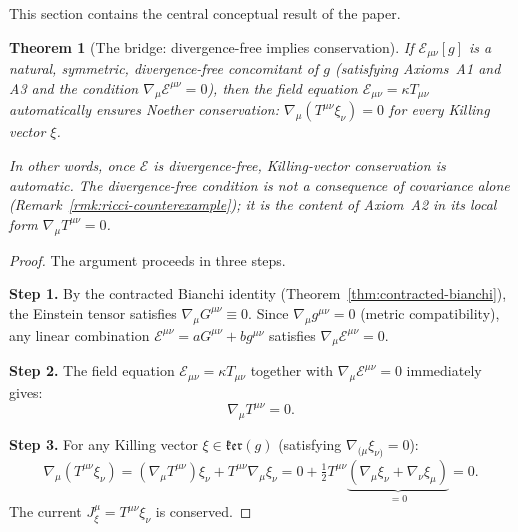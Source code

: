 \documentclass[12pt]{article}
\theoremstyle{plain}
\newtheorem{theorem}{Theorem}[section]
\theoremstyle{definition}
\theoremstyle{remark}
\begin{document}
This section contains the central conceptual result of the paper.

\begin{theorem}[The bridge: divergence-free implies conservation]\label{thm:bridge}
If $\mathcal{E}_{\mu\nu}[g]$ is a natural, symmetric, divergence-free concomitant of $g$ (satisfying Axioms~A1 and A3 and the condition $\nabla_\mu\mathcal{E}^{\mu\nu} = 0$), then the field equation $\mathcal{E}_{\mu\nu} = \kappa T_{\mu\nu}$ automatically ensures Noether conservation: $\nabla_\mu(T^{\mu\nu}\xi_\nu) = 0$ for every Killing vector $\xi$.

In other words, once $\mathcal{E}$ is divergence-free, Killing-vector conservation is automatic. The divergence-free condition is \emph{not} a consequence of covariance alone (Remark~\ref{rmk:ricci-counterexample}); it is the content of Axiom~A2 in its local form $\nabla_\mu T^{\mu\nu}=0$.
\end{theorem}

\begin{proof}
The argument proceeds in three steps.

\textbf{Step 1.} By the contracted Bianchi identity (Theorem~\ref{thm:contracted-bianchi}), the Einstein tensor satisfies $\nabla_\mu G^{\mu\nu} \equiv 0$. Since $\nabla_\mu g^{\mu\nu} = 0$ (metric compatibility), any linear combination $\mathcal{E}^{\mu\nu} = aG^{\mu\nu} + bg^{\mu\nu}$ satisfies $\nabla_\mu\mathcal{E}^{\mu\nu} = 0$.

\textbf{Step 2.} The field equation $\mathcal{E}_{\mu\nu} = \kappa T_{\mu\nu}$ together with $\nabla_\mu\mathcal{E}^{\mu\nu} = 0$ immediately gives:
\begin{equation}\label{eq:divT}
\nabla_\mu T^{\mu\nu} = 0.
\end{equation}

\textbf{Step 3.} For any Killing vector $\xi \in \mathfrak{ker}(g)$ (satisfying $\nabla_{(\mu}\xi_{\nu)} = 0$):
\begin{equation}
\nabla_\mu(T^{\mu\nu}\xi_\nu) = (\nabla_\mu T^{\mu\nu})\xi_\nu + T^{\mu\nu}\nabla_\mu\xi_\nu = 0 + \tfrac{1}{2}T^{\mu\nu}\underbrace{(\nabla_\mu\xi_\nu + \nabla_\nu\xi_\mu)}_{=0} = 0.
\end{equation}
The current $J^\mu_\xi = T^{\mu\nu}\xi_\nu$ is conserved.
\end{proof}
\end{document}
